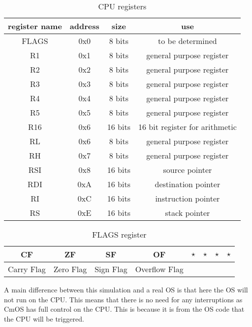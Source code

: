 \documentclass[a4paper,12pt]{article}
\begin{document}
\begin{table}[H]
    \centering
    \begin{tabular}{|c|c|c|c|}
        \hline
        register name & address  & size & use \\ 
        \hline
        FLAGS  & 0x0 & 8 bits  & to be determined \\
        R1     & 0x1 & 8 bits  & general purpose register \\
        R2     & 0x2 & 8 bits  & general purpose register \\
        R3     & 0x3 & 8 bits  & general purpose register \\
        R4     & 0x4 & 8 bits  & general purpose register \\
        R5     & 0x5 & 8 bits  & general purpose register \\
        R16    & 0x6 & 16 bits & 16 bit register for arithmetic \\
        RL     & 0x6 & 8 bits  & general purpose register \\
        RH     & 0x7 & 8 bits  & general purpose register \\
        RSI    & 0x8 & 16 bits & source pointer \\
        RDI    & 0xA & 16 bits & destination pointer \\
        RI     & 0xC & 16 bits & instruction pointer \\
        RS     & 0xE & 16 bits & stack pointer \\
        \hline
    \end{tabular}
    \caption{CPU registers}
    \label{tab:CPU registers}
\end{table}

\begin{table}[h]
    \centering
    \begin{tabular}{|c|c|c|c|c|c|c|c|}
        \hline
        CF  & ZF  & SF  & OF & $\star$ & $\star$ & $\star$ & $\star$ \\
        \hline
        Carry Flag & Zero Flag & Sign Flag & Overflow Flag & & & & \\
        \hline
    \end{tabular}
    \caption{FLAGS register}
    \label{tab:flags}
\end{table}

A main difference between this simulation and a real OS is that here the OS will not run on the CPU. This means that there is no need for any interruptions as CmOS has full control on the CPU. This is because it is from the OS code that the CPU will be triggered.
\end{document}
